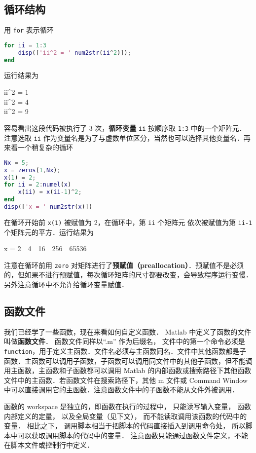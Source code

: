 \subsection{循环结构}
用 \texttt{for} 表示循环
\begin{lstlisting}[language=Matlab]
for ii = 1:3
    disp(['ii^2 = ' num2str(ii^2)]);
end
\end{lstlisting}
运行结果为
\begin{Command}
ii\^{}2 = 1 \\
ii\^{}2 = 4 \\
ii\^{}2 = 9 
\end{Command}
容易看出这段代码被执行了 3 次，\textbf{循环变量} \texttt{ii} 按顺序取 \texttt{1:3} 中的一个矩阵元．注意选取 \texttt{ii} 作为变量名是为了与虚数单位区分，当然也可以选择其他变量名．再来看一个稍复杂的循环
\begin{lstlisting}[language=Matlab]
Nx = 5;
x = zeros(1,Nx); 
x(1) = 2;
for ii = 2:numel(x)
    x(ii) = x(ii-1)^2;
end
disp(['x = ' num2str(x)])
\end{lstlisting}
在循环开始前 \texttt{x(1)} 被赋值为 2，在循环中，第 \texttt{ii} 个矩阵元 依次被赋值为第 \texttt{ii-1} 个矩阵元的平方．运行结果为
\begin{Command}
x = 2\ \ 4\ \ 16\ \ 256\ \ 65536
\end{Command}
注意在循环前用 \texttt{zero} 对矩阵进行了\textbf{预赋值（preallocation）}．预赋值不是必须的，但如果不进行预赋值，每次循环矩阵的尺寸都要改变，会导致程序运行变慢．另外注意循环中不允许给循环变量赋值．

\subsection{函数文件}

我们已经学了一些函数，现在来看如何自定义函数． Matlab 中定义了函数的文件叫做\textbf{函数文件}． 函数文件同样以“.m” 作为后缀名， 文件中的第一个命令必须是 \texttt{function}，用于定义主函数．文件名必须与主函数同名．文件中其他函数都是子函数．主函数可以调用子函数，子函数可以调用同文件中的其他子函数，但不能调用主函数，主函数和子函数都可以调用 Matlab 的内部函数或搜索路径下其他函数文件中的主函数．若函数文件在搜索路径下，其他 m 文件或 Command Window 中可以直接调用它的主函数．注意函数文件中的子函数不能从文件外被调用．

函数的 workspace 是独立的，即函数在执行的过程中， 只能读写输入变量， 函数内部定义的定量， 以及全局变量（见下文），%
而不能读取调用该函数的代码中的变量． 相比之下， 调用脚本相当于把脚本的代码直接插入到调用命令处， 所以脚本中可以获取调用脚本的代码中的变量． 注意函数只能通过函数文件定义，不能在脚本文件或控制行中定义．

